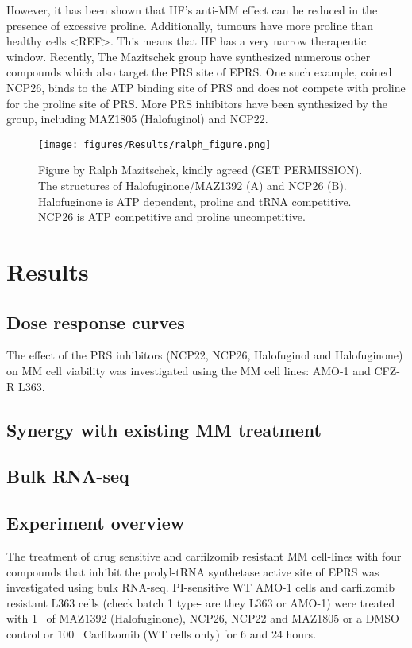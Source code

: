 However, it has been shown that HF’s anti-MM effect can be reduced in the presence of excessive proline.
Additionally, tumours have more proline than healthy cells <REF>.
This means that HF has a very narrow therapeutic window.
Recently, The Mazitschek group have synthesized numerous other compounds which also target the PRS site of EPRS. One such example, coined NCP26, binds to the ATP binding site of PRS and does not compete with proline for the proline site of PRS.
More PRS inhibitors have been synthesized by the group, including MAZ1805 (Halofuginol) and NCP22.

\begin{figure}[ht]
    \centering
    \texttt{[image: figures/Results/ralph\_figure.png]}
    \caption[Halofuginone and NCP26 structures]{Figure by Ralph Mazitschek, kindly agreed (GET PERMISSION).
    The structures of Halofuginone/MAZ1392 (A) and NCP26 (B).
    Halofuginone is ATP dependent, proline and tRNA competitive.
    NCP26 is ATP competitive and proline uncompetitive.
    }
    \label{fig:ralph_diagrams}
\end{figure}



\section{Results}

\subsection{Dose response curves}
The effect of the PRS inhibitors (NCP22, NCP26, Halofuginol and Halofuginone) on MM cell viability was investigated using the MM cell lines: AMO-1 and CFZ-R L363.

\subsection{Synergy with existing MM treatment}

\subsection{Bulk RNA-seq}

\subsection{Experiment overview}
The treatment of drug sensitive and carfilzomib resistant MM cell-lines with four compounds that inhibit  the  prolyl-tRNA  synthetase  active  site  of  EPRS  was investigated using bulk RNA-seq.
PI-sensitive WT AMO-1 cells and carfilzomib resistant L363 cells (check batch 1 type- are they L363 or AMO-1) were treated with 1\si{\micro\Molar} of MAZ1392 (Halofuginone), NCP26, NCP22 and MAZ1805 or a DMSO control or 100\si{\nano\Molar} Carfilzomib (WT cells only) for 6 and 24 hours.

